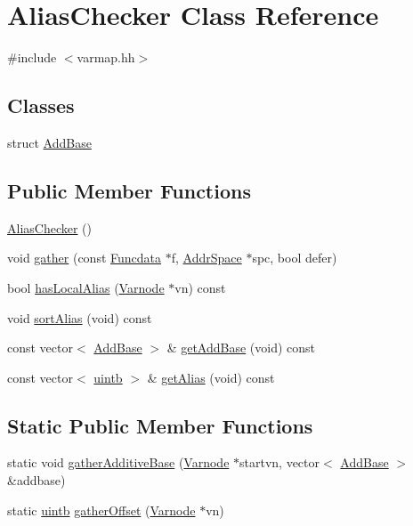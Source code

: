 \hypertarget{class_alias_checker}{}\section{Alias\+Checker Class Reference}
\label{class_alias_checker}


{\ttfamily \#include $<$varmap.\+hh$>$}

\subsection*{Classes}
\begin{DoxyCompactItemize}
\item 
struct \mbox{\hyperlink{struct_alias_checker_1_1_add_base}{Add\+Base}}
\end{DoxyCompactItemize}
\subsection*{Public Member Functions}
\begin{DoxyCompactItemize}
\item 
\mbox{\hyperlink{class_alias_checker_adeb4008b6f62e152a241b9f988bea4dc}{Alias\+Checker}} ()
\item 
void \mbox{\hyperlink{class_alias_checker_a66092e26df7c31f66bb375abc184a490}{gather}} (const \mbox{\hyperlink{class_funcdata}{Funcdata}} $\ast$f, \mbox{\hyperlink{class_addr_space}{Addr\+Space}} $\ast$spc, bool defer)
\item 
bool \mbox{\hyperlink{class_alias_checker_a2bcaccaa3b0553741c68abf06115e113}{has\+Local\+Alias}} (\mbox{\hyperlink{class_varnode}{Varnode}} $\ast$vn) const
\item 
void \mbox{\hyperlink{class_alias_checker_ad37b8720b4894d92a2c3904576aa8b70}{sort\+Alias}} (void) const
\item 
const vector$<$ \mbox{\hyperlink{struct_alias_checker_1_1_add_base}{Add\+Base}} $>$ \& \mbox{\hyperlink{class_alias_checker_af5696485bdbe41dd637ccb8987fa5303}{get\+Add\+Base}} (void) const
\item 
const vector$<$ \mbox{\hyperlink{types_8h_a2db313c5d32a12b01d26ac9b3bca178f}{uintb}} $>$ \& \mbox{\hyperlink{class_alias_checker_a3f531ba115361825fa5e38c5daf7d63d}{get\+Alias}} (void) const
\end{DoxyCompactItemize}
\subsection*{Static Public Member Functions}
\begin{DoxyCompactItemize}
\item 
static void \mbox{\hyperlink{class_alias_checker_a3a5fa2b60bb9d039a77105a26a04604d}{gather\+Additive\+Base}} (\mbox{\hyperlink{class_varnode}{Varnode}} $\ast$startvn, vector$<$ \mbox{\hyperlink{struct_alias_checker_1_1_add_base}{Add\+Base}} $>$ \&addbase)
\item 
static \mbox{\hyperlink{types_8h_a2db313c5d32a12b01d26ac9b3bca178f}{uintb}} \mbox{\hyperlink{class_alias_checker_af74df8f4fb5c4c3678180456bcc42b81}{gather\+Offset}} (\mbox{\hyperlink{class_varnode}{Varnode}} $\ast$vn)
\end{DoxyCompactItemize}



